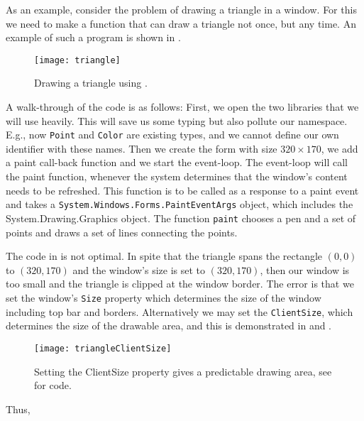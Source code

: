 As an example, consider the problem of drawing a triangle in a window. For this we need to make a function that can draw a triangle not once, but any time. An example of such a program is shown in .
%
%
\begin{figure}
  \centering
  \texttt{[image: triangle]}
  \caption{Drawing a triangle using .}
  \label{fig:triangle}
\end{figure}
%
A walk-through of the code is as follows: First, we open the two libraries that we will use heavily. This will save us some typing but also pollute our namespace. E.g., now \lstinline{Point} and \lstinline{Color} are existing types, and we cannot define our own identifier with these names. Then we create the form with size $320\times 170$, we add a paint call-back function and we start the event-loop. The event-loop will call the paint function, whenever the system determines that the window's content needs to be refreshed. This function is to be called as a response to a paint event and takes a \lstinline!System.Windows.Forms.PaintEventArgs! object, which includes the System.Drawing.Graphics object. The function \lstinline{paint} chooses a pen and a set of points and draws a set of lines connecting the points.

The code in  is not optimal. In spite that the triangle spans the rectangle $(0,0)$ to $(320,170)$ and the window's size is set to $(320,170)$, then our window is too small and the triangle is clipped at the window border. The error is that we set the window's \lstinline{Size} property which determines the size of the window including top bar and borders. Alternatively we may set the \lstinline{ClientSize}, which determines the size of the drawable area, and this is demonstrated in  and .
%
%
\begin{figure}
  \centering
  \texttt{[image: triangleClientSize]}
  \caption{Setting the ClientSize property gives a predictable drawing area, see  for code.}
  \label{fig:triangleClientSize}
\end{figure}
%
Thus, 

